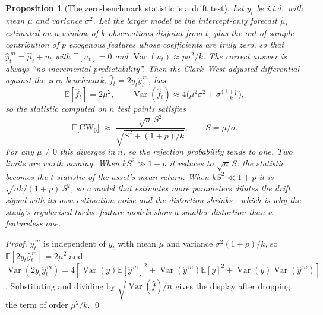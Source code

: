 \documentclass{article}
\theoremstyle{plain}
\newtheorem{proposition}[theorem]{Proposition}
\theoremstyle{definition}
\begin{document}
\begin{proposition}[The zero-benchmark statistic is a drift test]
\label{prop:distortion}
Let $y_t$ be i.i.d.\ with mean $\mu$ and variance $\sigma^2$. Let the larger model be the
intercept-only forecast $\hat\mu_t$ estimated on a window of $k$ observations disjoint from
$t$, plus the out-of-sample contribution of $p$ exogenous features whose coefficients are
truly zero, so that $\hat y^{\,m}_t=\hat\mu_t+u_t$ with $\mathbb{E}[u_t]=0$ and
$\operatorname{Var}(u_t)\approx p\sigma^2/k$. The correct answer is always ``no incremental
predictability''. Then the Clark--West adjusted differential against the zero benchmark,
$\hat f_t = 2y_t\hat y^{\,m}_t$, has
\[
  \mathbb{E}[\hat f_t] = 2\mu^2,\qquad
  \operatorname{Var}(\hat f_t) \approx 4\Big(\mu^2\sigma^2+\sigma^4\tfrac{1+p}{k}\Big),
\]
so the statistic computed on $n$ test points satisfies
\[
  \mathbb{E}\big[\mathrm{CW}_0\big]\;\approx\;
  \frac{\sqrt{n}\,S^{2}}{\sqrt{S^{2}+(1+p)/k}},\qquad S=\mu/\sigma .
\]
For any $\mu\neq0$ this diverges in $n$, so the rejection probability tends to one. Two
limits are worth naming. When $kS^2\gg 1+p$ it reduces to $\sqrt{n}\,S$: \emph{the statistic
becomes the $t$-statistic of the asset's mean return}. When $kS^2\ll 1+p$ it is
$\sqrt{nk/(1+p)}\,S^2$, so a model that estimates more parameters dilutes the drift signal
with its own estimation noise and the distortion shrinks---which is why the study's
regularised twelve-feature models show a smaller distortion than a featureless one.
\end{proposition}

\begin{proof}
$\hat y^{\,m}_t$ is independent of $y_t$ with mean $\mu$ and variance
$\sigma^2(1+p)/k$, so $\mathbb{E}[2y_t\hat y^{\,m}_t]=2\mu^2$ and
$\operatorname{Var}(2y_t\hat y^{\,m}_t)=
4[\operatorname{Var}(y)\mathbb{E}[\hat y^{\,m}]^2+
\operatorname{Var}(\hat y^{\,m})\mathbb{E}[y]^2+
\operatorname{Var}(y)\operatorname{Var}(\hat y^{\,m})]$.
Substituting and dividing by $\sqrt{\operatorname{Var}(\hat f)/n}$ gives the display after
dropping the term of order $\mu^2/k$. \qed
\end{proof}
\end{document}

